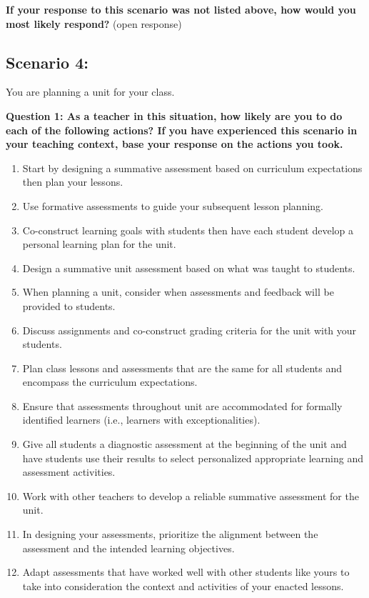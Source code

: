 \documentclass[
]{book}
\providecommand{\tightlist}{%
  \setlength{\itemsep}{0pt}\setlength{\parskip}{0pt}}
\begin{document}
\textbf{If your response to this scenario was not listed above, how would you most likely respond?} (open response)

\hypertarget{section}{%
\subsection{}\label{section}}

\hypertarget{scenario-4}{%
\subsection{Scenario 4:}\label{scenario-4}}

You are planning a unit for your class.

\textbf{Question 1: As a teacher in this situation, how likely are you to do each of the following actions? If you have experienced this scenario in your teaching context, base your response on the actions you took.}

\begin{enumerate}
\def\labelenumi{\arabic{enumi}.}
\tightlist
\item
  Start by designing a summative assessment based on curriculum expectations then plan your lessons.
\item
  Use formative assessments to guide your subsequent lesson planning.
\item
  Co-construct learning goals with students then have each student develop a personal learning plan for the unit.
\item
  Design a summative unit assessment based on what was taught to students.
\item
  When planning a unit, consider when assessments and feedback will be provided to students.
\item
  Discuss assignments and co-construct grading criteria for the unit with your students.
\item
  Plan class lessons and assessments that are the same for all students and encompass the curriculum expectations.
\item
  Ensure that assessments throughout unit are accommodated for formally identified learners (i.e., learners with exceptionalities).
\item
  Give all students a diagnostic assessment at the beginning of the unit and have students use their results to select personalized appropriate learning and assessment activities.
\item
  Work with other teachers to develop a reliable summative assessment for the unit.
\item
  In designing your assessments, prioritize the alignment between the assessment and the intended learning objectives.
\item
  Adapt assessments that have worked well with other students like yours to take into consideration the context and activities of your enacted lessons.
\end{enumerate}
\end{document}
